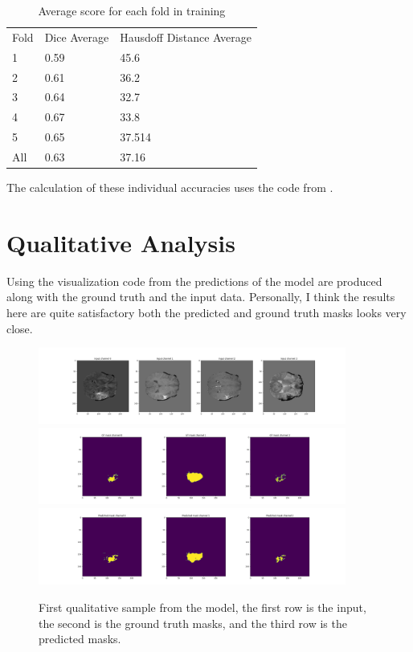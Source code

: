 \documentclass[onecolumn]{article}
\begin{document}
\begin{table}[!ht] \label{tab:1}
\begin{tabular}{lll}
Fold & Dice Average & Hausdoff Distance Average \\
1    & 0.59         & 45.6                      \\
2    & 0.61         & 36.2                      \\
3    & 0.64         & 32.7                      \\
4    & 0.67         & 33.8                      \\
5    & 0.65         & 37.514                    \\
All  & 0.63         & 37.16                     \\
\end{tabular}
\caption{Average score for each fold in training}
\end{table}

\newpage

The calculation of these individual accuracies uses the code from \cite{training}. 

\section{Qualitative Analysis}

Using the visualization code from \cite{monaitutorial} the predictions of the model are produced along with the ground truth and the input data. Personally, I think the results here are quite satisfactory both the predicted and ground truth masks looks very close.

\begin{figure}[!ht]
	\centering
	\includegraphics[width=0.9\textwidth]{imgs/inputs1.png}
	\includegraphics[width=0.9\textwidth]{imgs/gt1.png}
	\includegraphics[width=0.9\textwidth]{imgs/pred1.png}
	\caption{First qualitative sample from the model, the first row is the input, the second is the ground truth masks, and the third row is the predicted masks.}
	\label{fig:res2}
\end{figure}
\end{document}

